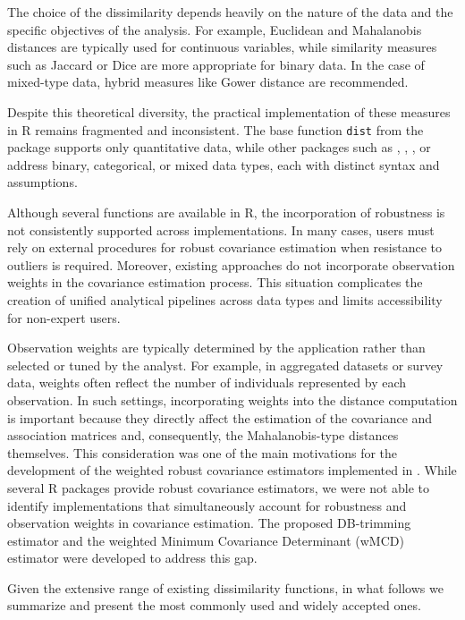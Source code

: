 The choice of the dissimilarity depends heavily on the nature of the data and the specific objectives of the analysis. For example, Euclidean and Mahalanobis distances are typically used for continuous variables, while similarity measures such as Jaccard or Dice are more appropriate for binary data. In the case of mixed-type data, hybrid measures like Gower distance are recommended.

Despite this theoretical diversity, the practical implementation of these measures in R remains fragmented and inconsistent. The base function \texttt{dist} from the  package supports only quantitative data, while other packages such as  \citep{ade4},  \citep{StatMatch},  \citep{clusterpackage}, or  \citep{gowerpackage} address binary, categorical, or mixed data types, each with distinct syntax and assumptions. 

Although several functions are available in R, the incorporation of robustness is not consistently supported across implementations. In many cases, users must rely on external procedures for robust covariance estimation when resistance to outliers is required. Moreover, existing approaches do not incorporate observation weights in the covariance estimation process. This situation complicates the creation of unified analytical pipelines across data types and limits accessibility for non-expert users.

Observation weights are typically determined by the application rather than selected or tuned by the analyst. For example, in aggregated datasets or survey data, weights often reflect the number of individuals represented by each observation. In such settings, incorporating weights into the distance computation is important because they directly affect the estimation of the covariance and association matrices and, consequently, the Mahalanobis-type distances themselves. This consideration was one of the main motivations for the development of the weighted robust covariance estimators implemented in . While several R packages provide robust covariance estimators, we were not able to identify implementations that simultaneously account for robustness and observation weights in covariance estimation. The proposed DB-trimming estimator \citep{boj2024robustification} and the weighted Minimum Covariance Determinant (wMCD) estimator \citep{Boj2026} were developed to address this gap.

Given the extensive range of existing dissimilarity functions, in what follows we summarize and present the most commonly used and widely accepted ones.

